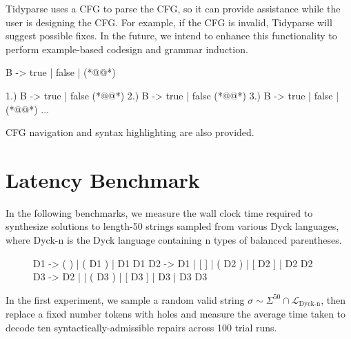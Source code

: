 \documentclass[sigplan,nonacm]{acmart}\settopmatter{printfolios=false,printccs=false,printacmref=false}
\begin{document}
Tidyparse uses a CFG to parse the CFG, so it can provide assistance while the user is designing the CFG. For example, if the CFG is invalid, Tidyparse will suggest possible fixes. In the future, we intend to enhance this functionality to perform example-based codesign and grammar induction.

\begin{tidyinput}
B -> true | false | (*@\caret{ }@*)
\end{tidyinput}
\begin{tidyoutput}
1.) B -> true | false (*@\hlred{ }@*)
2.) B -> true | false (*@@*)
3.) B -> true | false | (*@@*)
...
\end{tidyoutput}

\noindent CFG navigation and syntax highlighting are also provided.

\pagebreak
\section{Latency Benchmark}\label{sec:latency}

In the following benchmarks, we measure the wall clock time required to synthesize solutions to length-50 strings sampled from various Dyck languages, where Dyck-n is the Dyck language containing n types of balanced parentheses.

\begin{figure}[H]
\begin{tidyinput}
D1 -> ( ) | ( D1 ) | D1 D1
D2 -> D1 | [ ] | ( D2 ) | [ D2 ] | D2 D2
D3 -> D2 | { } | ( D3 ) | [ D3 ] | { D3 } | D3 D3
\end{tidyinput}
\end{figure}

\noindent In the first experiment, we sample a random valid string $\sigma \sim \Sigma^{50} \cap \mathcal{L}_{\text{Dyck-n}}$, then replace a fixed number tokens with holes and measure the average time taken to decode ten syntactically-admissible repairs across 100 trial runs.

\begin{figure}[H]
\hspace{-0.25cm}
\end{figure}
\end{document}
